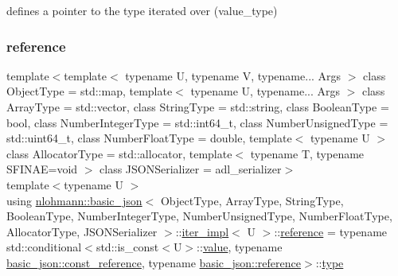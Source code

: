 defines a pointer to the type iterated over (value\+\_\+type) 

\mbox{\label{classnlohmann_1_1basic__json_1_1iter__impl_ae09599e9cb4a947020a0265c0c4f3d5e}} 
\subsubsection{\texorpdfstring{reference}{reference}}
{\footnotesize\ttfamily template$<$template$<$ typename U, typename V, typename... Args $>$ class Object\+Type = std\+::map, template$<$ typename U, typename... Args $>$ class Array\+Type = std\+::vector, class String\+Type  = std\+::string, class Boolean\+Type  = bool, class Number\+Integer\+Type  = std\+::int64\+\_\+t, class Number\+Unsigned\+Type  = std\+::uint64\+\_\+t, class Number\+Float\+Type  = double, template$<$ typename U $>$ class Allocator\+Type = std\+::allocator, template$<$ typename T, typename S\+F\+I\+N\+A\+E=void $>$ class J\+S\+O\+N\+Serializer = adl\+\_\+serializer$>$ \\
template$<$typename U $>$ \\
using \mbox{\hyperlink{classnlohmann_1_1basic__json}{nlohmann\+::basic\+\_\+json}}$<$ Object\+Type, Array\+Type, String\+Type, Boolean\+Type, Number\+Integer\+Type, Number\+Unsigned\+Type, Number\+Float\+Type, Allocator\+Type, J\+S\+O\+N\+Serializer $>$\+::\mbox{\hyperlink{classnlohmann_1_1basic__json_1_1iter__impl}{iter\+\_\+impl}}$<$ U $>$\+::\mbox{\hyperlink{classnlohmann_1_1basic__json_1_1iter__impl_ae09599e9cb4a947020a0265c0c4f3d5e}{reference}} =  typename std\+::conditional$<$std\+::is\+\_\+const$<$U$>$\+::\mbox{\hyperlink{classnlohmann_1_1basic__json_1_1iter__impl_a92e849ca687355935c02f492be936b68}{value}}, typename \mbox{\hyperlink{classnlohmann_1_1basic__json_a4057c5425f4faacfe39a8046871786ca}{basic\+\_\+json\+::const\+\_\+reference}}, typename \mbox{\hyperlink{classnlohmann_1_1basic__json_ac6a5eddd156c776ac75ff54cfe54a5bc}{basic\+\_\+json\+::reference}}$>$\+::\mbox{\hyperlink{classnlohmann_1_1basic__json_a2b2d781d7f2a4ee41bc0016e931cadf7}{type}}}



